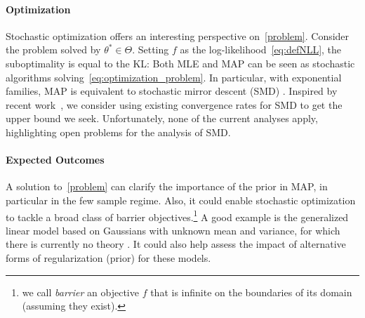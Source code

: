 \documentclass[twoside]{article}
\newcommand{\nat}{\theta}
\begin{document}
\paragraph{Optimization} 
Stochastic optimization offers an interesting perspective on~\eqref{problem}.
Consider the problem
solved by $\nat^*\in \Theta$.
Setting $f$ as the log-likelihood~\eqref{eq:defNLL}, the suboptimality is equal to the KL:
\alignn{
	f(\nat) - f(\nat^*) = \KL\paren{p_{\nat^*} || p_{\nat} } .
	\label{eq:suboptimalityKL}
}
Both MLE and MAP can be seen as stochastic algorithms solving~\eqref{eq:optimization_problem}.
In particular, with exponential families, MAP is equivalent to stochastic mirror descent (SMD) \citep{nemirovski2009robust}.
Inspired by recent work~\citep{lepriol2021analysis, kunstner2020homeomorphic}, we consider using existing convergence rates for SMD to get the upper bound we seek.
Unfortunately, none of the current analyses apply, highlighting open problems for the analysis of SMD.

\paragraph{Expected Outcomes}
A solution to~\eqref{problem} can clarify the importance of the prior in MAP, in particular in the few sample regime. %
Also, it could enable stochastic optimization to tackle a broad class of barrier objectives.\footnote{we call \emph{barrier} an objective $f$ that is infinite on the boundaries of its domain (assuming they exist).}
A good example is the generalized linear model based on Gaussians with unknown mean and variance, for which there is currently no theory \citep{bach2013nonstronglyconvex}.
It could also help assess the impact of alternative forms of regularization (prior) for these models.
\end{document}
